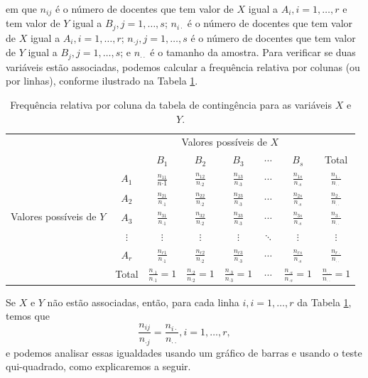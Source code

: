 \documentclass[]{article}
\begin{document}
em que \(n_{ij}\) é o número de docentes que tem valor de \(X\) igual a \(A_i, i=1, \dots, r\) e tem valor de \(Y\) igual a \(B_j, j=1, \dots, s\); \(n_{i\cdot}\)
é o número de docentes que tem valor de \(X\) igual a \(A_i, i=1, \dots, r\);
\(n_{\cdot j}, j=1, \dots, s\) é o número de docentes que tem valor de \(Y\) igual a
\(B_j, j=1, \dots, s\); e \(n_{\cdot \cdot}\) é o tamanho da amostra. Para verificar se duas variáveis estão associadas, podemos
calcular a frequência relativa por colunas (ou por linhas), conforme ilustrado na
Tabela \ref{tab:FRContingencia}.

\begin{table}[htbp]
  \centering
  \caption{Frequência relativa por coluna da tabela de contingência para as variáveis $X$ e $Y$.}
  \label{tab:FRContingencia}
  \begin{tabular}{c|c|ccccc|c}
    &  & \multicolumn{5}{|c|}{Valores possíveis de $X$} & \\ \cline{3-7}
    &  & $B_1$ & $B_2$ & $B_3$ & $\cdots$ & $B_s$ & Total\\ \hline
  \multirow{5}{*}{Valores possíveis de $Y$}  & $A_1$ & $\frac{n_{11}}{n{\cdot 1}}$ & $\frac{n_{12}}{n_{\cdot 2}}$ & $\frac{n_{13}}{n_{\cdot 3}}$ & $\cdots$ & $\frac{n_{1s}}{n_{\cdot s}}$ & $\frac{n_{1\cdot}}{n_{\cdot \cdot}}$ \\
    & $A_2$ & $\frac{n_{21}}{n_{\cdot 1}}$ & $\frac{n_{22}}{n_{\cdot 2}}$ & $\frac{n_{23}}{n_{\cdot 3}}$ & $\cdots$ & $\frac{n_{2s}}{n_{\cdot s}}$ & $\frac{n_{2\cdot}}{n_{\cdot \cdot}}$ \\
    & $A_3$ & $\frac{n_{31}}{n_{\cdot 1}}$ & $\frac{n_{32}}{n_{\cdot 2}}$ & $\frac{n_{33}}{n_{\cdot 3}}$ & $\cdots$ & $\frac{n_{3s}}{n_{\cdot s}}$ & $\frac{n_{3\cdot}}{n_{\cdot \cdot}}$ \\
    & $\vdots$ & $\vdots$ & $\vdots$ & $\vdots$ & $\ddots$ & $\vdots$ & $\vdots$\\
    & $A_r$ & $\frac{n_{r1}}{n_{\cdot 1}}$ & $\frac{n_{r2}}{n_{\cdot 2}}$ & $\frac{n_{r3}}{n_{\cdot 3}}$ & $\cdots$ & $\frac{n_{rs}}{n_{\cdot s}}$ & $\frac{n_{r\cdot}}{n_{\cdot \cdot}}$  \\ \hline
    & Total & $\frac{n_{\cdot 1}}{n_{\cdot 1}} = 1$ & $\frac{n_{\cdot 2}}{n_{\cdot 2}}=1$ & $\frac{n_{\cdot 3}}{n_{\cdot 3}} = 1$ & $\cdots$ & $\frac{n_{\cdot s}}{n_{\cdot s}} = 1$ & $\frac{n_{\cdot \cdot}}{n_{\cdot \cdot}}=1$ 
  \end{tabular}
\end{table}

Se \(X\) e \(Y\) não estão associadas, então, para cada linha \(i, i=1, \dots, r\) da Tabela \ref{tab:FRContingencia},
temos que
\begin{equation}
\frac{n_{ij}}{n_{\cdot j}} = \frac{n_{i\cdot }}{n_{\cdot \cdot}}, i=1, \dots, r,
\label{eq:equality}
\end{equation}
e podemos analisar essas igualdades usando um gráfico de barras e usando o teste
qui-quadrado, como explicaremos a seguir.
\end{document}
